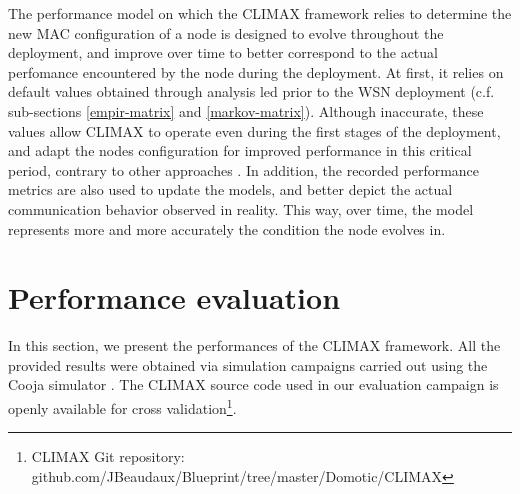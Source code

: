 \documentclass[12pt,journal,compsoc]{IEEEtran}
\begin{document}
The performance model on which the CLIMAX framework relies to determine the new MAC configuration of a node is designed to evolve throughout the deployment, and improve over time to better correspond to the actual perfomance encountered by the node during the deployment. At first, it relies on default values obtained through analysis led prior to the WSN deployment (c.f. sub-sections \ref{empir-matrix} and \ref{markov-matrix}). Although inaccurate, these values allow CLIMAX to operate even during the first stages of the deployment, and adapt the nodes configuration for improved performance in this critical period, contrary to other approaches \cite{zfm12ptunes, ecc12cross, mh10duty}. In addition, the recorded performance metrics are also used to update the models, and better depict the actual communication behavior observed in reality. This way, over time, the model represents more and more accurately the condition the node  evolves in.

\section{Performance evaluation}
\label{results}

In this section, we present the performances of the CLIMAX framework. All the provided results were obtained via simulation campaigns carried out using the Cooja simulator \cite{?}.
The CLIMAX source code used in our evaluation campaign is openly available for cross validation\footnote{CLIMAX Git repository:\\ github.com/JBeaudaux/Blueprint/tree/master/Domotic/CLIMAX}.
\end{document}
